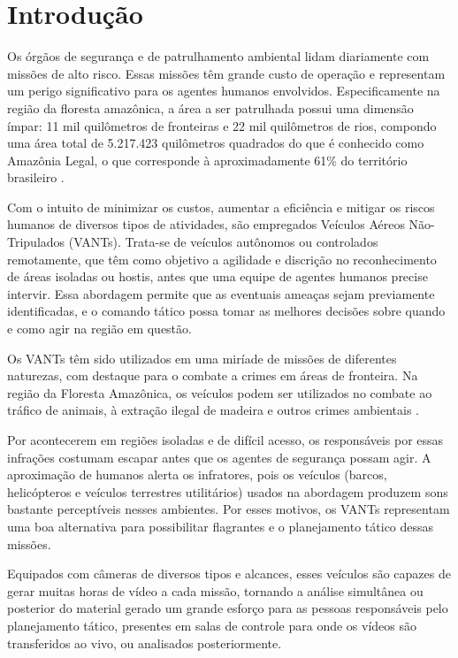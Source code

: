 \chapter{Introdução}

Os órgãos de segurança e de patrulhamento ambiental lidam diariamente com missões de alto risco. Essas missões têm grande custo de operação e representam um perigo significativo para os agentes humanos envolvidos. Especificamente na região da floresta amazônica, a área a ser patrulhada possui uma dimensão ímpar: 11 mil quilômetros de fronteiras e 22 mil quilômetros de rios, compondo uma área total de 5.217.423 quilômetros quadrados do que é conhecido como Amazônia Legal, o que corresponde à aproximadamente 61\% do território brasileiro \cite{ibge}.

Com o intuito de minimizar os custos, aumentar a eficiência e mitigar os riscos humanos de diversos tipos de atividades, são empregados Veículos Aéreos Não-Tripulados (VANTs). Trata-se de veículos autônomos ou controlados remotamente, que têm como objetivo a agilidade e discrição no reconhecimento de áreas isoladas ou hostis, antes que uma equipe de agentes humanos precise intervir. Essa abordagem permite que as eventuais ameaças sejam previamente identificadas, e o comando tático possa tomar as melhores decisões sobre quando e como agir na região em questão.

Os VANTs têm sido utilizados em uma miríade de missões de diferentes naturezas, com destaque para o combate a crimes em áreas de fronteira. Na região da Floresta Amazônica, os veículos podem ser utilizados no combate ao tráfico de animais, à extração ilegal de madeira e outros crimes ambientais \cite{silva:2013}.

Por acontecerem em regiões isoladas e de difícil acesso, os responsáveis por essas infrações costumam escapar antes que os agentes de segurança possam agir. A aproximação de humanos alerta os infratores, pois os veículos (barcos, helicópteros e veículos terrestres utilitários) usados na abordagem produzem sons bastante perceptíveis nesses ambientes. Por esses motivos, os VANTs representam uma boa alternativa para possibilitar flagrantes e o planejamento tático dessas missões.

Equipados com câmeras de diversos tipos e alcances, esses veículos são capazes de gerar muitas horas de vídeo a cada missão, tornando a análise simultânea ou posterior do material gerado um grande esforço para as pessoas responsáveis pelo planejamento tático, presentes em salas de controle para onde os vídeos são transferidos ao vivo, ou analisados posteriormente.

